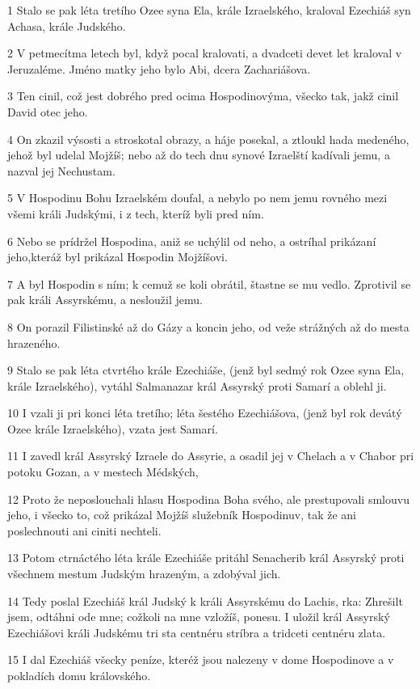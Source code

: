 \par 1 Stalo se pak léta tretího Ozee syna Ela, krále Izraelského, kraloval Ezechiáš syn Achasa, krále Judského.
\par 2 V petmecítma letech byl, když pocal kralovati, a dvadceti devet let kraloval v Jeruzaléme. Jméno matky jeho bylo Abi, dcera Zachariášova.
\par 3 Ten cinil, což jest dobrého pred ocima Hospodinovýma, všecko tak, jakž cinil David otec jeho.
\par 4 On zkazil výsosti a stroskotal obrazy, a háje posekal, a ztloukl hada medeného, jehož byl udelal Mojžíš; nebo až do tech dnu synové Izraelští kadívali jemu, a nazval jej Nechustam.
\par 5 V Hospodinu Bohu Izraelském doufal, a nebylo po nem jemu rovného mezi všemi králi Judskými, i z tech, kteríž byli pred ním.
\par 6 Nebo se prídržel Hospodina, aniž se uchýlil od neho, a ostríhal prikázaní jeho,kteráž byl prikázal Hospodin Mojžíšovi.
\par 7 A byl Hospodin s ním; k cemuž se koli obrátil, štastne se mu vedlo. Zprotivil se pak králi Assyrskému, a nesloužil jemu.
\par 8 On porazil Filistinské až do Gázy a koncin jeho, od veže strážných až do mesta hrazeného.
\par 9 Stalo se pak léta ctvrtého krále Ezechiáše, (jenž byl sedmý rok Ozee syna Ela, krále Izraelského), vytáhl Salmanazar král Assyrský proti Samarí a oblehl ji.
\par 10 I vzali ji pri konci léta tretího; léta šestého Ezechiášova, (jenž byl rok devátý Ozee krále Izraelského), vzata jest Samarí.
\par 11 I zavedl král Assyrský Izraele do Assyrie, a osadil jej v Chelach a v Chabor pri potoku Gozan, a v mestech Médských,
\par 12 Proto že neposlouchali hlasu Hospodina Boha svého, ale prestupovali smlouvu jeho, i všecko to, což prikázal Mojžíš služebník Hospodinuv, tak že ani poslechnouti ani ciniti nechteli.
\par 13 Potom ctrnáctého léta krále Ezechiáše pritáhl Senacherib král Assyrský proti všechnem mestum Judským hrazeným, a zdobýval jich.
\par 14 Tedy poslal Ezechiáš král Judský k králi Assyrskému do Lachis, rka: Zhrešilt jsem, odtáhni ode mne; cožkoli na mne vzložíš, ponesu. I uložil král Assyrský Ezechiášovi králi Judskému tri sta centnéru stríbra a tridceti centnéru zlata.
\par 15 I dal Ezechiáš všecky peníze, kteréž jsou nalezeny v dome Hospodinove a v pokladích domu královského.
